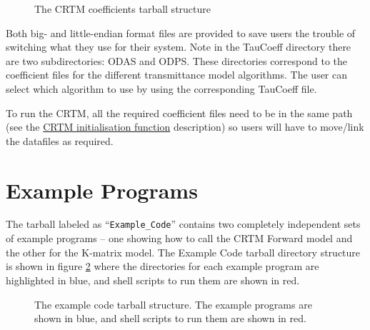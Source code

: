 \begin{figure}[htb]
  \centering
  
  \caption{The CRTM coefficients tarball structure}
  \label{fig:crtm_coefficients_dir}
\end{figure}

Both big- and little-endian format files are provided to save users the trouble of switching what they use for their system. Note in the TauCoeff directory there are two subdirectories: ODAS and ODPS. These directories correspond to the coefficient files for the different transmittance model algorithms. The user can select which algorithm to use by using the corresponding TauCoeff file.

To run the CRTM, all the required coefficient files need to be in the same path (see the  \hyperref[sec:CRTM_Init_interface]{CRTM initialisation function} description) so users will have to move/link the datafiles as required.


\section{Example Programs}
The tarball labeled as ``\texttt{Example\_Code}'' contains two completely independent sets of example programs -- one showing how to call the CRTM Forward model and the other for the K-matrix model. The Example Code tarball directory structure is shown in figure \ref{fig:example_code_dir}  where the directories for each example program are highlighted in blue, and shell scripts to run them are shown in red.

\begin{figure}[htb]
  \centering
  
  \caption{The example code tarball structure. The example programs are shown in blue, and shell scripts to run them are shown in red.}
  \label{fig:example_code_dir}
\end{figure}

